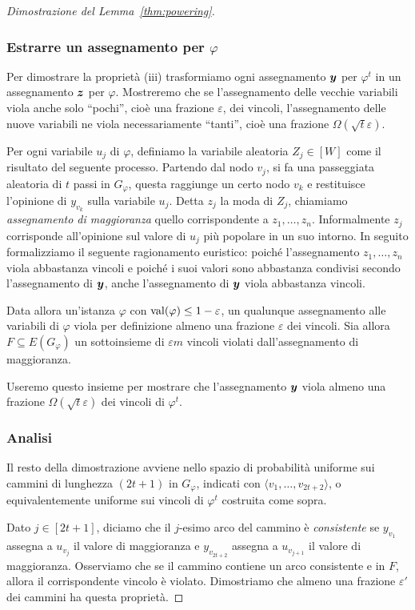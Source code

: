 \begin{proof}[Dimostrazione del Lemma~\ref{thm:powering}]
	\subsubsection{Estrarre un assegnamento per $\varphi$}
	Per dimostrare la proprietà (iii) trasformiamo ogni assegnamento $\bm{y}$
	per $\varphi^t$ in un assegnamento $\bm{z}$ per $\varphi$. Mostreremo
	che se l'assegnamento delle vecchie variabili viola anche solo ``pochi'',
	cioè una frazione $\varepsilon$, dei vincoli, l'assegnamento delle nuove
	variabili ne viola necessariamente ``tanti'', cioè una frazione
	$\Omega(\sqrt{t}\varepsilon)$.

	Per ogni variabile $u_j$ di $\varphi$, definiamo la variabile aleatoria
	$Z_j \in [W]$ come il risultato del seguente processo.
	Partendo dal nodo $v_j$, si fa una passeggiata aleatoria di $t$ passi in
	$G_\varphi$, questa raggiunge un certo nodo $v_k$ e restituisce l'opinione di
	$y_{v_k}$ sulla variabile $u_j$. Detta $z_j$ la moda di $Z_j$, chiamiamo
	\emph{assegnamento di maggioranza} quello corrispondente a $z_1, \ldots, z_n$.
	Informalmente $z_j$ corrisponde all'opinione sul valore di $u_j$ più
	popolare in un suo intorno.
	In seguito formalizziamo il seguente ragionamento euristico:
	poiché l'assegnamento $z_1, \ldots, z_n$ viola abbastanza vincoli e poiché i
	suoi valori sono abbastanza condivisi secondo l'assegnamento di $\bm{y}$,
	anche l'assegnamento di $\bm{y}$ viola abbastanza vincoli.

	Data allora un'istanza $\varphi$ con $\operatorname{val}(\varphi) \le 1 - \varepsilon$,
	un qualunque assegnamento alle variabili di $\varphi$ viola per definizione
	almeno una frazione $\varepsilon$ dei vincoli.
	Sia allora $F \subseteq E(G_\varphi)$ un sottoinsieme di $\varepsilon m$
	vincoli violati dall'assegnamento di maggioranza.

	Useremo questo insieme per mostrare che l'assegnamento $\bm{y}$ viola
	almeno una frazione $\Omega(\sqrt{t} \varepsilon)$ dei vincoli di $\varphi^t$.

	\subsubsection{Analisi}
	Il resto della dimostrazione avviene nello spazio di probabilità uniforme
	sui cammini di lunghezza $(2t + 1)$ in $G_\varphi$, indicati con
	$\langle v_1, \dots, v_{2t + 2} \rangle$, o equivalentemente uniforme sui
	vincoli di $\varphi^t$ costruita come sopra.
	
	Dato $j \in [2t + 1]$, diciamo che il $j$-esimo arco del
	cammino è \emph{consistente} se $y_{v_1}$ assegna a $u_{v_j}$ il valore di
	maggioranza e $y_{v_{2t + 2}}$ assegna a $u_{v_{j + 1}}$ il valore di
	maggioranza.
	Osserviamo che se il cammino contiene un arco consistente e in $F$, allora
	il corrispondente vincolo è violato. Dimostriamo che almeno una frazione
	$\varepsilon'$ dei cammini ha questa proprietà.


\end{proof}
